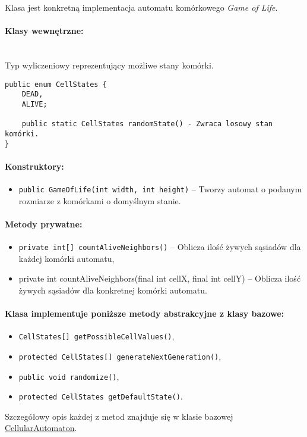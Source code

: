 \documentclass{report}
\begin{document}
Klasa jest konkretną implementacja automatu komórkowego \textit{Game of Life}.

\paragraph{Klasy wewnętrzne:} \mbox{} \\
Typ wyliczeniowy reprezentujący możliwe stany komórki.
\begin{verbatim}
public enum CellStates {
    DEAD,
    ALIVE;

    public static CellStates randomState() - Zwraca losowy stan komórki.
}
\end{verbatim}

\paragraph{Konstruktory:}
\begin{itemize}
	\item \texttt{public GameOfLife(int width, int height)} -- Tworzy automat o podanym rozmiarze z komórkami o domyślnym stanie.
\end{itemize}

\paragraph{Metody prywatne:}
\begin{itemize}
    \item \texttt{private int[] countAliveNeighbors()} -- Oblicza ilość żywych sąsiadów dla każdej komórki automatu,
    \item private int countAliveNeighbors(final int cellX, final int cellY) -- Oblicza ilość żywych sąsiadów dla konkretnej komórki automatu.
\end{itemize}

\paragraph{Klasa implementuje poniższe metody abstrakcyjne z klasy bazowe:}
\begin{itemize}
    \item \texttt{CellStates[] getPossibleCellValues()},
    \item \texttt{protected CellStates[] generateNextGeneration()},
    \item \texttt{public void randomize()},
    \item \texttt{protected CellStates getDefaultState()}.
\end{itemize}
Szczegółowy opis każdej z metod znajduje się w klasie bazowej \hyperref[subsec:cellularAutomaton]{CellularAutomaton}.
\end{document}
